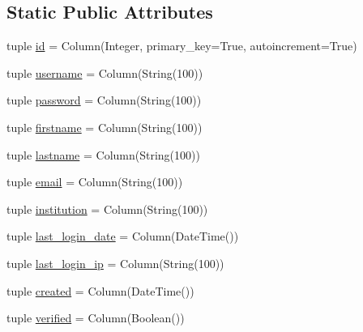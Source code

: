 \subsection*{\-Static \-Public \-Attributes}
\begin{DoxyCompactItemize}
\item 
tuple \hyperlink{classcyberweb_1_1model_1_1user_1_1_user_ab204ad563a4069d43a98083399508934}{id} = \-Column(\-Integer, primary\-\_\-key=\-True, autoincrement=\-True)
\item 
tuple \hyperlink{classcyberweb_1_1model_1_1user_1_1_user_a622a0b8371f0f5ac334b8a485818540f}{username} = \-Column(\-String(100))
\item 
tuple \hyperlink{classcyberweb_1_1model_1_1user_1_1_user_ae3536eefd4acd7d3973cb98cbaf35184}{password} = \-Column(\-String(100))
\item 
tuple \hyperlink{classcyberweb_1_1model_1_1user_1_1_user_a81bef5db8920f8f8b0449fe95c3835b7}{firstname} = \-Column(\-String(100))
\item 
tuple \hyperlink{classcyberweb_1_1model_1_1user_1_1_user_ae60d91304ee84117a23ba9869561fdf4}{lastname} = \-Column(\-String(100))
\item 
tuple \hyperlink{classcyberweb_1_1model_1_1user_1_1_user_a1125690b551d91248947ec992b7857f6}{email} = \-Column(\-String(100))
\item 
tuple \hyperlink{classcyberweb_1_1model_1_1user_1_1_user_a6078404e7083920ae68d45ebe7d2b5be}{institution} = \-Column(\-String(100))
\item 
tuple \hyperlink{classcyberweb_1_1model_1_1user_1_1_user_aa440dcb0314bf064641a5118c4f79b5d}{last\-\_\-login\-\_\-date} = \-Column(\-Date\-Time())
\item 
tuple \hyperlink{classcyberweb_1_1model_1_1user_1_1_user_a3e4adcf41f726094914bb1bca94e254f}{last\-\_\-login\-\_\-ip} = \-Column(\-String(100))
\item 
tuple \hyperlink{classcyberweb_1_1model_1_1user_1_1_user_a8a64500997eb63538d09793237c6a3db}{created} = \-Column(\-Date\-Time())
\item 
tuple \hyperlink{classcyberweb_1_1model_1_1user_1_1_user_a6e8101f9904d43468d411698701b4465}{verified} = \-Column(\-Boolean())
\end{DoxyCompactItemize}


